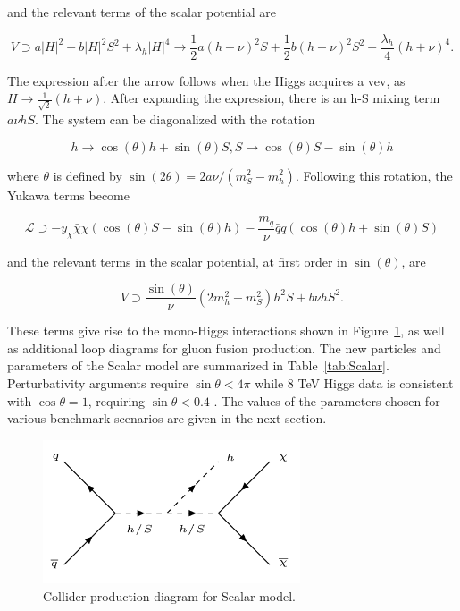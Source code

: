 and the relevant terms of the scalar potential are

\begin{equation}
V \supset a |H|^2 + b |H|^2 S^2 + \lambda_h |H|^4 \rightarrow \frac{1}{2} a (h+\nu)^2 S + \frac{1}{2} b (h+\nu)^2 S^2 + \frac{\lambda_h}{4}(h+\nu)^4.
\end{equation}

The expression after the arrow follows when the Higgs acquires a vev, as $H \rightarrow \frac{1}{\sqrt{2}} (h + \nu)$. After expanding the expression, there is an h-S mixing term $a\nu hS$. The system can be diagonalized with the rotation

\begin{equation}
h \rightarrow \cos(\theta) h + \sin(\theta) S, S \rightarrow \cos(\theta) S - \sin(\theta) h
\end{equation}

where $\theta$ is defined by $\sin(2\theta) = 2a\nu/(m_S^2-m_h^2)$. Following this rotation, the Yukawa terms become

\begin{equation}
\mathcal{L} \supset -y_\chi \bar{\chi} \chi (\cos(\theta) S - \sin(\theta) h) - \frac{m_q}{\nu} \bar{q} q (\cos(\theta) h + \sin(\theta) S)
\end{equation}

and the relevant terms in the scalar potential, at first order in $\sin(\theta)$, are

\begin{equation}
V \supset \frac{\sin(\theta)}{\nu}(2m_h^2 + m_S^2) h^2 S + b \nu h S^2.
\end{equation}

These terms give rise to the mono-Higgs interactions shown in Figure~\ref{fig:scsig}, as well as additional loop diagrams for gluon fusion production. The new particles and parameters of the Scalar model are summarized in Table~\ref{tab:Scalar}. Perturbativity arguments require $\sin\theta<4\pi$ \cite{Carpenter:2013xra} while 8 TeV Higgs data is consistent with $\cos\theta=1$, requiring $\sin\theta<0.4$ \cite{Falkowski:2013dza, Djouadi:2013qya, Giardino:2013bma, Ellis:2013lra}. The values of the parameters chosen for various benchmark scenarios are given in the next section.

\begin{figure}[tbh]
\centering
\includegraphics[width=3in]{figures/scsig.png}
\caption{Collider production diagram for Scalar model.}
\label{fig:scsig}
\end{figure}


